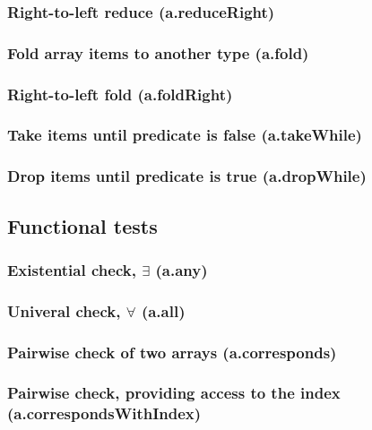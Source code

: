 \documentclass{article}
\theoremstyle{definition}
\begin{document}
\subsubsection{Right-to-left reduce (a.reduceRight)}

\subsubsection{Fold array items to another type (a.fold)}

\subsubsection{Right-to-left fold (a.foldRight)}

\subsubsection{Take items until predicate is false (a.takeWhile)}

\subsubsection{Drop items until predicate is true (a.dropWhile)}

\subsection{Functional tests}

\subsubsection{Existential check, $\exists$ (a.any)}

\subsubsection{Univeral check, $\forall$ (a.all)}

\subsubsection{Pairwise check of two arrays (a.corresponds)}

\subsubsection{Pairwise check, providing access to the index (a.correspondsWithIndex)}
\end{document}
